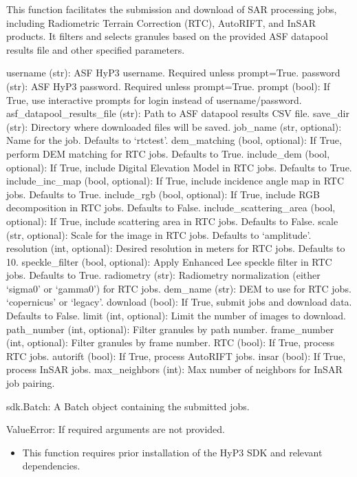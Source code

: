 \documentclass[letterpaper,10pt,english]{sphinxmanual}
\begin{document}
\begin{fulllineitems}
\sphinxAtStartPar
This function facilitates the submission and download of SAR processing jobs, including Radiometric Terrain 
Correction (RTC), AutoRIFT, and InSAR products. It filters and selects granules based on the provided ASF datapool 
results file and other specified parameters.
\begin{description}
\sphinxAtStartPar
username (str): ASF HyP3 username. Required unless prompt=True.
password (str): ASF HyP3 password. Required unless prompt=True.
prompt (bool): If True, use interactive prompts for login instead of username/password.
asf\_datapool\_results\_file (str): Path to ASF datapool results CSV file.
save\_dir (str): Directory where downloaded files will be saved.
job\_name (str, optional): Name for the job. Defaults to ‘rtc\sphinxhyphen{}test’.
dem\_matching (bool, optional): If True, perform DEM matching for RTC jobs. Defaults to True.
include\_dem (bool, optional): If True, include Digital Elevation Model in RTC jobs. Defaults to True.
include\_inc\_map (bool, optional): If True, include incidence angle map in RTC jobs. Defaults to True.
include\_rgb (bool, optional): If True, include RGB decomposition in RTC jobs. Defaults to False.
include\_scattering\_area (bool, optional): If True, include scattering area in RTC jobs. Defaults to False.
scale (str, optional): Scale for the image in RTC jobs. Defaults to ‘amplitude’.
resolution (int, optional): Desired resolution in meters for RTC jobs. Defaults to 10.
speckle\_filter (bool, optional): Apply Enhanced Lee speckle filter in RTC jobs. Defaults to True.
radiometry (str): Radiometry normalization (either ‘sigma0’ or ‘gamma0’) for RTC jobs.
dem\_name (str): DEM to use for RTC jobs. ‘copernicus’ or ‘legacy’.
download (bool): If True, submit jobs and download data. Defaults to False.
limit (int, optional): Limit the number of images to download.
path\_number (int, optional): Filter granules by path number.
frame\_number (int, optional): Filter granules by frame number.
RTC (bool): If True, process RTC jobs.
autorift (bool): If True, process AutoRIFT jobs.
insar (bool): If True, process InSAR jobs.
max\_neighbors (int): Max number of neighbors for InSAR job pairing.

\sphinxAtStartPar
sdk.Batch: A Batch object containing the submitted jobs.

\sphinxAtStartPar
ValueError: If required arguments are not provided.

\begin{itemize}
\item {} 
\sphinxAtStartPar
This function requires prior installation of the HyP3 SDK and relevant dependencies.


\end{itemize}
\end{description}
\end{fulllineitems}
\end{document}
